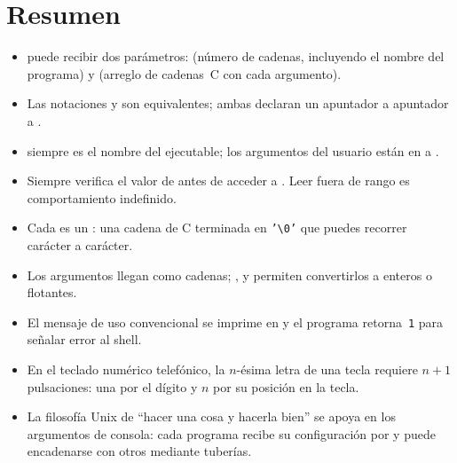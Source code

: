 \documentclass[12pt, oneside]{article}
\begin{document}
\section*{Resumen}

\begin{itemize}
  \item {} puede recibir dos parámetros: 
        (número de cadenas, incluyendo el nombre del programa) y
         (arreglo de cadenas~C con cada argumento).
  \item Las notaciones  y  son
        equivalentes; ambas declaran un apuntador a apuntador a .
  \item {} siempre es el nombre del ejecutable; los argumentos
        del usuario están en  a .
  \item Siempre verifica el valor de  antes de acceder a
        .  Leer fuera de rango es comportamiento indefinido.
  \item Cada  es un : una cadena de C terminada
        en \texttt{'\textbackslash{}0'} que puedes recorrer carácter a carácter.
  \item Los argumentos llegan como cadenas; ,  y
         permiten convertirlos a enteros o flotantes.
  \item El mensaje de uso convencional se imprime en  y el
        programa retorna~\texttt{1} para señalar error al shell.
  \item En el teclado numérico telefónico, la $n$-ésima letra de una
        tecla requiere $n+1$ pulsaciones: una por el dígito y $n$ por
        su posición en la tecla.
  \item La filosofía Unix de ``hacer una cosa y hacerla bien'' se apoya
        en los argumentos de consola: cada programa recibe su
        configuración por  y puede encadenarse con otros
        mediante tuberías.
\end{itemize}
\end{document}
